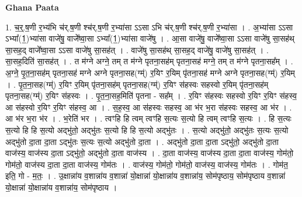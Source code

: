 \documentclass[17pt]{extarticle}
\begin{document}
\textbf{Ghana Paata } \newline

1. च॒र्॒.ष॒णी र॒भ्य॑भि च॑र्.ष॒णी श्च॑र्.ष॒णी र॒भ्या॑सा ऽऽसा ऽभि च॑र्.ष॒णी श्च॑र्.ष॒णी र॒भ्या॑सा । . अ॒भ्या॑सा ऽऽसा ऽभ्या᳚(1॒)भ्या॑सा वाजे॑षु॒ वाजे᳚ष्वा॒सा ऽभ्या᳚(1॒)भ्या॑सा वाजे॑षु । . आ॒सा वाजे॑षु॒ वाजे᳚ष्वा॒सा ऽऽसा वाजे॑षु सा॒सह॑थ् सा॒सह॒द् वाजे᳚ष्वा॒सा ऽऽसा वाजे॑षु सा॒सह॑त् । . वाजे॑षु सा॒सह॑थ् सा॒सह॒द् वाजे॑षु॒ वाजे॑षु सा॒सह॑त् । . सा॒सह॒दिति॑ सा॒सह॑त् । . त म॑ग्ने अग्ने॒ तम् त म॑ग्ने पृतना॒सह॑म् पृतना॒सह॑ मग्ने॒ तम् त म॑ग्ने पृतना॒सह᳚म् । . अ॒ग्ने॒ पृ॒त॒ना॒सह॑म् पृतना॒सह॑ मग्ने अग्ने पृतना॒सह(ग्म्॑) र॒यिꣳ र॒यिम् पृ॑तना॒सह॑ मग्ने अग्ने पृतना॒सह(ग्म्॑) र॒यिम् । . पृ॒त॒ना॒सह(ग्म्॑) र॒यिꣳ र॒यिम् पृ॑तना॒सह॑म् पृतना॒सह(ग्म्॑) र॒यिꣳ स॑हस्वः सहस्वो र॒यिम् पृ॑तना॒सह॑म् पृतना॒सह(ग्म्॑) र॒यिꣳ स॑हस्वः । . पृ॒त॒ना॒सह॒मिति॑ पृतना - सह᳚म् । . र॒यिꣳ स॑हस्वः सहस्वो र॒यिꣳ र॒यिꣳ स॑हस्व॒ आ स॑हस्वो र॒यिꣳ र॒यिꣳ स॑हस्व॒ आ । . स॒ह॒स्व॒ आ स॑हस्वः सहस्व॒ आ भ॑र भ॒रा स॑हस्वः सहस्व॒ आ भ॑र । . आ भ॑र भ॒रा भ॑र । . भ॒रेति॑ भर । . त्वꣳहि हि त्वम् त्वꣳहि स॒त्यः स॒त्यो हि त्वम् त्वꣳहि स॒त्यः । . हि स॒त्यः स॒त्यो हि हि स॒त्यो अद्भु॑तो॒ अद्भु॑तः स॒त्यो हि हि स॒त्यो अद्भु॑तः । . स॒त्यो अद्भु॑तो॒ अद्भु॑तः स॒त्यः स॒त्यो अद्भु॑तो दा॒ता दा॒ता ऽद्भु॑तः स॒त्यः स॒त्यो अद्भु॑तो दा॒ता । . अद्भु॑तो दा॒ता दा॒ता ऽद्भु॑तो॒ अद्भु॑तो दा॒ता वाज॑स्य॒ वाज॑स्य दा॒ता ऽद्भु॑तो॒ अद्भु॑तो दा॒ता वाज॑स्य । . दा॒ता वाज॑स्य॒ वाज॑स्य दा॒ता दा॒ता वाज॑स्य॒ गोम॑तो॒ गोम॑तो॒ वाज॑स्य दा॒ता दा॒ता वाज॑स्य॒ गोम॑तः । . वाज॑स्य॒ गोम॑तो॒ गोम॑तो॒ वाज॑स्य॒ वाज॑स्य॒ गोम॑तः । . गोम॑त॒ इति॒ गो - म॒तः॒ । . उ॒क्षान्ना॑य व॒शान्ना॑य व॒शान्ना॑ यो॒क्षान्ना॑ यो॒क्षान्ना॑य व॒शान्ना॑य॒ सोम॑पृष्ठाय॒ सोम॑पृष्ठाय व॒शान्ना॑ यो॒क्षान्ना॑ यो॒क्षान्ना॑य व॒शान्ना॑य॒ सोम॑पृष्ठाय । \newline
\end{document}
